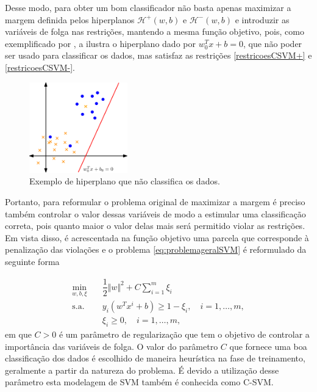 \documentclass[12pt,a4paper]{scrartcl}
\def\Hset{\mathcal{H}}
\theoremstyle{definition}%
\begin{document}
Desse modo, para obter um bom classificador não basta apenas maximizar a margem definida pelos hiperplanos $\Hset^{+} (w,b)$ e $\Hset^{-} (w,b)$ e introduzir as variáveis de folga nas restrições, mantendo a mesma função objetivo, pois, como exemplificado por \textcite{Evelin2017}, a  ilustra o hiperplano dado por $w_{0}^{T}x+b = 0$, que não poder ser usado para classificar os dados, mas satisfaz as restrições \eqref{restricoesCSVM+} e \eqref{restricoesCSVM-}. 

\begin{figure}[!ht] 
	\centering
	\includegraphics[width=0.38\textwidth]{hiperplano_nao_classifica_dados}
	\caption{Exemplo de hiperplano que não classifica os dados. \label{fig:hiperplano_nao_classificador}}
\end{figure}
 

Portanto, para reformular o problema original de maximizar a margem é preciso também controlar o valor dessas variáveis de modo a estimular uma classificação correta, pois quanto maior o valor delas mais será permitido violar as restrições. Em vista disso, é acrescentada na função objetivo uma parcela que corresponde à penalização das violações e o problema \eqref{eq:problemageralSVM} é reformulado da seguinte forma

\[ \label{eq:problemaCSVM}
\begin{aligned}
\min_{w,b,\xi} & \quad \dfrac{1}{2} \Vert w\Vert^{2} + C \sum_{i=1}^{m} \xi_{i} \\
\text{s.a.} &  \quad y_i(w^{T}x^{i}+b) \geq 1 - \xi_{i}, \quad i=1, \ldots , m, \\
& \quad \xi_{i} \geq 0, \quad i=1, \ldots , m,\end{aligned}
\]
em que $C>0$ é um parâmetro de regularização que tem o objetivo de controlar a importância das variáveis de folga. O valor do parâmetro $C$ que fornece uma boa classificação dos dados é escolhido de maneira heurística na fase de treinamento, geralmente a partir da natureza do problema. É devido a utilização desse parâmetro esta modelagem de SVM também é conhecida como C-SVM.
\end{document}
